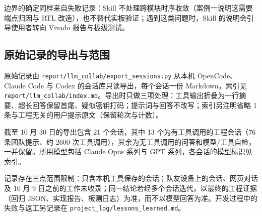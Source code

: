 边界的确定同样来自失败记录：Skill 不处理跨模块时序收敛（案例一说明这需要端点归因与 RTL 改造），也不替代实板验证；遇到这类问题时，Skill 的说明会引导使用者转向 Vivado 报告与板级测试。

\Needspace{85pt}

\subsection{原始记录的导出与范围}

原始记录由 \texttt{report/\allowbreak{}llm\_\allowbreak{}collab/\allowbreak{}export\_\allowbreak{}sessions.\allowbreak{}py} 从本机 OpenCode、Claude Code 与 Codex 的会话库只读导出，每个会话一份 Markdown，索引见 \texttt{report/\allowbreak{}llm\_\allowbreak{}collab/\allowbreak{}index.\allowbreak{}md}。导出时只做三项处理：工具输出折叠为一行摘要、超长回答保留首尾、疑似密钥打码；提示词与回答不改写；索引另注明省略 1 条与工程无关的用户提示原文（保留轮次与计数）。

截至 10 月 30 日的导出包含 21 个会话，其中 13 个为有工具调用的工程会话（76 条团队提示、约 2600 次工具调用），其余为无工具调用的问答和模型/工具自检，一并保留。所用模型包括 Claude Opus 系列与 GPT 系列，各会话的模型标识见索引。

记录存在三点范围限制：只含本机工具保存的会话；队友设备上的会话、网页对话及 10 月 9 日之前的工作未收录；同一结论若经多个会话迭代，以最终的工程证据（回归 JSON、实现报告、板测日志）为准，而不以模型回答为准。开发过程中的失败与返工另记录在 \texttt{project\_\allowbreak{}log/\allowbreak{}lessons\_\allowbreak{}learned.\allowbreak{}md}。
